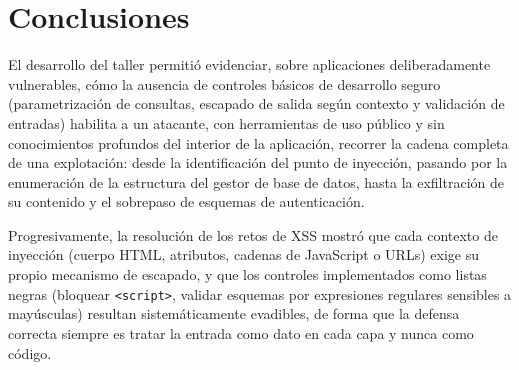 \section*{Conclusiones}

El desarrollo del taller permitió evidenciar, sobre aplicaciones deliberadamente vulnerables, cómo la ausencia de controles básicos de desarrollo seguro (parametrización de consultas, escapado de salida según contexto y validación de entradas) habilita a un atacante, con herramientas de uso público y sin conocimientos profundos del interior de la aplicación, recorrer la cadena completa de una explotación: desde la identificación del punto de inyección, pasando por la enumeración de la estructura del gestor de base de datos, hasta la exfiltración de su contenido y el sobrepaso de esquemas de autenticación.

Progresivamente, la resolución de los retos de XSS mostró que cada contexto de inyección (cuerpo HTML, atributos, cadenas de JavaScript o URLs) exige su propio mecanismo de escapado, y que los controles implementados como listas negras (bloquear \texttt{<script>}, validar esquemas por expresiones regulares sensibles a mayúsculas) resultan sistemáticamente evadibles, de forma que la defensa correcta siempre es tratar la entrada como dato en cada capa y nunca como código.

